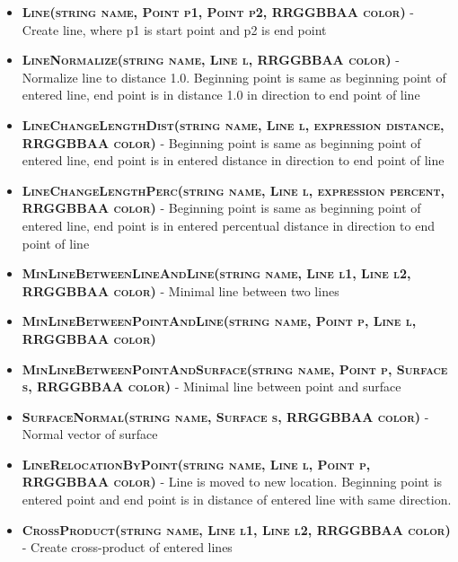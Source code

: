 \begin{itemize}
\item \textsc{\textbf{Line(string name, Point p1, Point p2, RRGGBBAA color)}}  - Create line, where p1 is start point and p2 is end point

\item \textsc{\textbf{LineNormalize(string name, Line l, RRGGBBAA color)}} - Normalize line to distance 1.0. Beginning point is same as beginning point of entered line, end point is in distance 1.0 in direction to end point of line

\item \textsc{\textbf{LineChangeLengthDist(string name, Line l, expression distance, RRGGBBAA color)}} - Beginning point is same as beginning point of entered line, end point is in entered distance in direction to end point of line
		
\item \textsc{\textbf{LineChangeLengthPerc(string name, Line l, expression percent, RRGGBBAA color)}} - Beginning point is same as beginning point of entered line, end point is in entered percentual distance in direction to end point of line



		
\item \textsc{\textbf{MinLineBetweenLineAndLine(string name, Line l1, Line l2, RRGGBBAA color)}} - Minimal line between two lines
		
\item \textsc{\textbf{MinLineBetweenPointAndLine(string name, Point p, Line l, RRGGBBAA color)}}
		
\item \textsc{\textbf{MinLineBetweenPointAndSurface(string name, Point p, Surface s, RRGGBBAA color)}} - Minimal line between point and surface


\item \textsc{\textbf{SurfaceNormal(string name, Surface s, RRGGBBAA color)}}  - Normal vector of surface



\item \textsc{\textbf{LineRelocationByPoint(string name, Line l, Point p, RRGGBBAA color)}} - Line is moved to new location. Beginning point is entered point and end point is in distance of entered line with same direction.
\item \textsc{\textbf{CrossProduct(string name, Line l1, Line l2, RRGGBBAA color)}} - Create cross-product of entered lines

\end{itemize}




